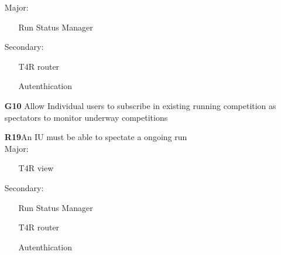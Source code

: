 \begin{itemize}
Major:
\begin{itemize}
\item[\textbullet]Run Status Manager
\end{itemize}
Secondary:
\begin{itemize}
\item[\textbullet]T4R router
\item[\textbullet]Autenthication
\end{itemize}

\item [\textbf{G10}] Allow Individual users to subscribe in existing running competition as spectators to monitor underway competitions

\subitem \textbf{R19}An IU must be able to spectate a ongoing run \\

Major:
\begin{itemize}
\item[\textbullet]T4R view
\end{itemize}
Secondary:
\begin{itemize}
\item[\textbullet]Run Status Manager
\item[\textbullet]T4R router
\item[\textbullet]Autenthication
\end{itemize}
\end{itemize}
